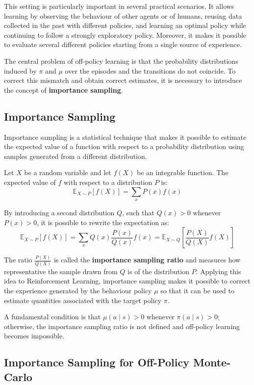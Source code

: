 This setting is particularly important in several practical scenarios. It allows learning by observing the behaviour of other agents or of humans, reusing data collected in the past with different policies, and learning an optimal policy while continuing to follow a strongly exploratory policy. Moreover, it makes it possible to evaluate several different policies starting from a single source of experience.

The central problem of off-policy learning is that the probability distributions induced by $\pi$ and $\mu$ over the episodes and the transitions do not coincide. To correct this mismatch and obtain correct estimates, it is necessary to introduce the concept of \textbf{importance sampling}.


\subsection{Importance Sampling}

Importance sampling is a statistical technique that makes it possible to estimate the expected value of a function with respect to a probability distribution using samples generated from a different distribution.

Let $X$ be a random variable and let $f(X)$ be an integrable function. The expected value of $f$ with respect to a distribution $P$ is:
\[
\mathbb{E}_{X \sim P}[f(X)] = \sum_x P(x) f(x)
\]

By introducing a second distribution $Q$, such that $Q(x) > 0$ whenever $P(x) > 0$, it is possible to rewrite the expectation as:
\[
\mathbb{E}_{X \sim P}[f(X)]
=
\sum_x Q(x) \frac{P(x)}{Q(x)} f(x)
=
\mathbb{E}_{X \sim Q}
\left[
\frac{P(X)}{Q(X)} f(X)
\right]
\]

The ratio $\frac{P(X)}{Q(X)}$ is called the \textbf{importance sampling ratio} and measures how representative the sample drawn from $Q$ is of the distribution $P$. Applying this idea to Reinforcement Learning, importance sampling makes it possible to correct the experience generated by the behaviour policy $\mu$ so that it can be used to estimate quantities associated with the target policy $\pi$.

A fundamental condition is that $\mu(a \mid s) > 0$ whenever $\pi(a \mid s) > 0$; otherwise, the importance sampling ratio is not defined and off-policy learning becomes impossible.


\subsection{Importance Sampling for Off-Policy Monte-Carlo}

